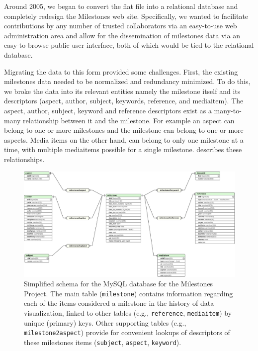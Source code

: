 Around 2005, we began to convert the flat file into a relational database and completely redesign the Milestones 
web site. Specifically, we wanted to facilitate contributions by any number of trusted
collaborators via an easy-to-use web administration area and allow for the dissemination of milestones data 
via an easy-to-browse public user interface, both of which would be tied to the relational database.

Migrating the data to this form provided some challenges. First, the existing milestones data needed to be
normalized and redundancy minimized. To do this, we broke the data into its relevant entities namely the 
milestone itself and its descriptors (aspect, author, subject, keywords, reference, and mediaitem).
The aspect, author, subject, keyword and reference descriptors exist as a many-to-many relationship between 
it and the milestone. For example an aspect can belong to one or more milestones and the milestone can belong to 
one or more aspects. Media items on the other hand, can belong to only one milestone at a time, with
multiple mediaitems possible for a single milestone.  describes these relationships.

\begin{figure}[!htb]
  \centering
  \includegraphics[width=\textwidth,clip]{fig/datavis-schema-2}
  \caption{Simplified schema for the MySQL database for the Milestones Project. The main 
  table (\texttt{milestone}) contains information regarding each of the items considered
  a milestone in the history of data visualization, linked to other tables 
  (e.g., \texttt{reference}, \texttt{mediaitem}) by unique (primary) keys.
  Other supporting tables (e.g., \texttt{milestone2aspect}) provide for convenient lookups of 
  descriptors of these milestones items (\texttt{subject}, \texttt{aspect}, \texttt{keyword}).
  }
  \label{fig:datavis-schema-2}
\end{figure}

